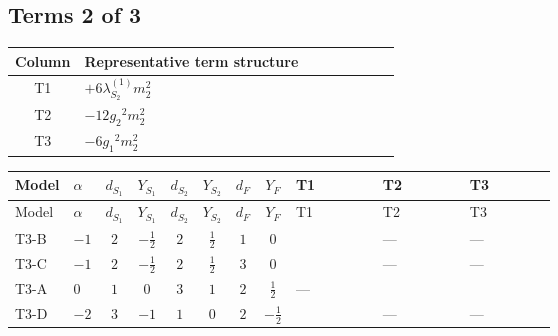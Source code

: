 \documentclass[8pt]{article}
\begin{document}
\begin{landscape}
\subsection*{Terms 2 of 3}
\begin{center}
\begin{tabular}{@{}c >{\raggedright\arraybackslash}p{0.82\linewidth}@{}}
\toprule
Column & Representative term structure \\
\midrule
T1 & \(\displaystyle +6 {\lambda_{S_2}^{(1)}} {m_2^2}\) \\
\midrule
T2 & \(\displaystyle -12 {g_2}^2 {m_2^2}\) \\
\midrule
T3 & \(\displaystyle -6 {g_1}^2 {m_2^2}\) \\
\midrule
\bottomrule
\end{tabular}
\end{center}
\smallskip
\tiny
\begin{longtable}{@{}llcccccc >{\raggedright\arraybackslash}p{0.21\linewidth} >{\raggedright\arraybackslash}p{0.21\linewidth} >{\raggedright\arraybackslash}p{0.21\linewidth}@{}}
\toprule
Model & $\alpha$ & $d_{S_1}$ & $Y_{S_1}$ & $d_{S_2}$ & $Y_{S_2}$ & $d_F$ & $Y_F$ & T1 & T2 & T3 \\
\midrule
\endfirsthead
\toprule
Model & $\alpha$ & $d_{S_1}$ & $Y_{S_1}$ & $d_{S_2}$ & $Y_{S_2}$ & $d_F$ & $Y_F$ & T1 & T2 & T3 \\
\midrule
\endhead
T3-B & $-1$ & $2$ & $-\frac{1}{2}$ & $2$ & $\frac{1}{2}$ & $1$ & $0$ & \scriptsize\adjustbox{max width=\linewidth}{$\begin{gathered} +6 {\lambda_{S_2}^{(1)}} {m_2^2}\end{gathered}$} & --- & --- \\
\midrule
T3-C & $-1$ & $2$ & $-\frac{1}{2}$ & $2$ & $\frac{1}{2}$ & $3$ & $0$ & \scriptsize\adjustbox{max width=\linewidth}{$\begin{gathered} +6 {\lambda_{S_2}^{(1)}} {m_2^2}\end{gathered}$} & --- & --- \\
\midrule
T3-A & $0$ & $1$ & $0$ & $3$ & $1$ & $2$ & $\frac{1}{2}$ & --- & \scriptsize\adjustbox{max width=\linewidth}{$\begin{gathered} -12 {g_2}^2 {m_2^2}\end{gathered}$} & \scriptsize\adjustbox{max width=\linewidth}{$\begin{gathered} -6 {g_1}^2 {m_2^2}\end{gathered}$} \\
\midrule
T3-D & $-2$ & $3$ & $-1$ & $1$ & $0$ & $2$ & $-\frac{1}{2}$ & \scriptsize\adjustbox{max width=\linewidth}{$\begin{gathered} +4 {\lambda_{S_2}^{(1)}} {m_2^2}\end{gathered}$} & --- & --- \\

\end{longtable}
\end{landscape}
\end{document}
